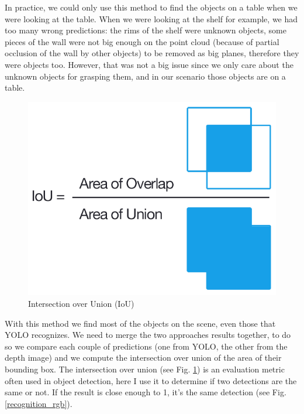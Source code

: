 \documentclass[a4paper, twocolumn]{article}
\begin{document}
    In practice, we could only use this method to find the objects on a table when we were looking at the table. When we were looking at the shelf for example, we had too many wrong predictions: the rims of the shelf were unknown objects, some pieces of the wall were not big enough on the point cloud (because of partial occlusion of the wall by other objects) to be removed as big planes, therefore they were objects too. However, that was not a big issue since we only care about the unknown objects for grasping them, and in our scenario those objects are on a table.
    
    \begin{figure}[!b]
        \includegraphics[width=\columnwidth]{../img/iou_equation.png}
        \caption{Intersection over Union (IoU)}
        \label{IoU}
    \end{figure}

    With this method we find most of the objects on the scene, even those that YOLO recognizes. We need to merge the two approaches results together, to do so we compare each couple of predictions (one from YOLO, the other from the depth image) and we compute the intersection over union of the area of their bounding box. The intersection over union (see Fig. \ref{IoU}) is an evaluation metric often used in object detection, here I use it to determine if two detections are the same or not. If the result is close enough to 1, it's the same detection (see Fig. \ref{recognition_rgb}).
\end{document}
